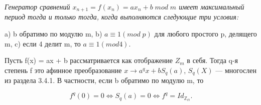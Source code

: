 \documentclass{../template/mai_book}
\begin{document}
\begin{thm}
\textit{Генератор сравнений $x_{n+1} = f(x_{n}) = ax_{n} + b \; mod \; m$ имеет максимальный период тогда и только тогда, когда выполняются следующие \linebreak три условия:} \par 
a) b обратимо по модулю m, \linebreak
\indent b) $a \equiv 1 (mod \; p)$ для любого простого p, делящего m, \linebreak
\indent c) если 4 делит m, то $a \equiv 1 (mod 4).$ \par
\end{thm}
\begin{lemma}
Пусть f(x) = ax + b рассматривается как отображение $Z_{m}$ в себя. \linebreak Тогда q-я степень f это афинное преобразование $x \to a^{q}x + bS_{q}(a)$, \linebreak $S_{q}(X)$ --- многослен из раздела 3.4.1. В частности, если b обратимо по \linebreak модулю m, то \par
$$f^{q}(0) = 0 \Leftrightarrow S_{q}(a) = 0 \Leftrightarrow f^{q} = Id_{\mathbb{Z_{m}}}.$$ \par
\end{lemma}
\end{document}
